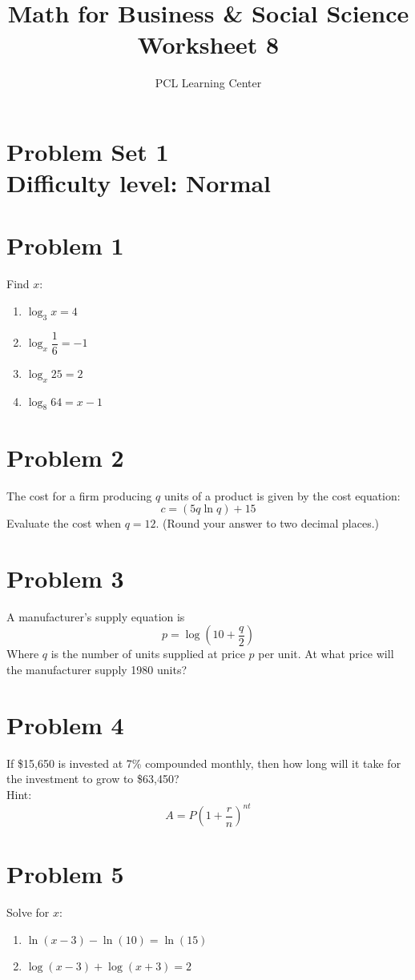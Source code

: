 \documentclass[12pt]{article}
\title{Math for Business \& Social Science\\ Worksheet 8}
\author{PCL Learning Center}
\date{}
\begin{document}
\maketitle

\section*{Problem Set 1\\Difficulty level: Normal}

\section*{Problem 1}
Find \( x \):
\begin{enumerate}[label=(\alph*)]
    \item \( \log_3 x = 4 \)
    \item \( \log_x \dfrac{1}{6} = -1 \)
    \item \( \log_x 25 = 2 \)
    \item \( \log_8 64 = x - 1 \)
\end{enumerate}

\section*{Problem 2}
The cost for a firm producing \( q \) units of a product is given by the cost equation:
\[
c = (5q \ln q) + 15
\]
Evaluate the cost when \( q = 12 \). (Round your answer to two decimal places.)

\section*{Problem 3}
A manufacturer’s supply equation is 
\[
p = \log\left(10 + \frac{q}{2} \right)
\]
Where \( q \) is the number of units supplied at price \( p \) per unit. At what price will the manufacturer supply 1980 units?

\section*{Problem 4}
If \$15,650 is invested at 7\% compounded monthly, then how long will it take for the investment to grow to \$63,450?\\
Hint: 
\[
A = P \left(1 + \frac{r}{n} \right)^{nt}
\]

\section*{Problem 5}
Solve for \( x \):
\begin{enumerate}[label=(\alph*)]
    \item \( \ln(x - 3) - \ln(10) = \ln(15) \)
    \item \( \log(x - 3) + \log(x + 3) = 2 \)
\end{enumerate}
\end{document}
